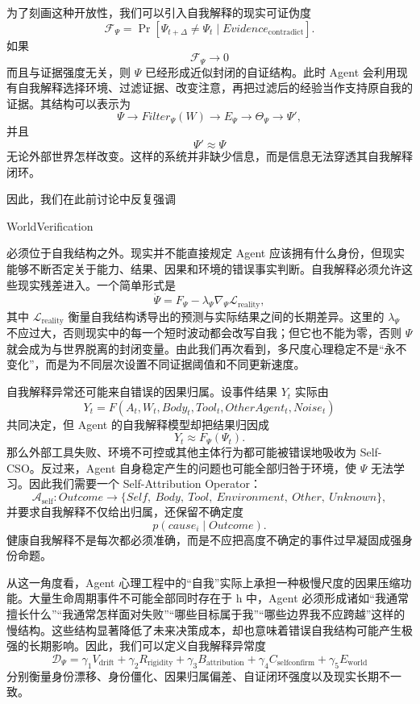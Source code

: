 为了刻画这种开放性，我们可以引入自我解释的现实可证伪度
\[
\mathcal F_{\Psi}
=
\Pr
\left[
\Psi_{t+\Delta}
\neq
\Psi_t
\mid
Evidence_{\mathrm{contradict}}
\right].
\]
如果
\[
\mathcal F_{\Psi}\rightarrow 0
\]
而且与证据强度无关，则 $\Psi$ 已经形成近似封闭的自证结构。此时 Agent 会利用现有自我解释选择环境、过滤证据、改变注意，再把过滤后的经验当作支持原自我的证据。其结构可以表示为
\[
\Psi
\rightarrow
Filter_\Psi(W)
\rightarrow
E_\Psi
\rightarrow
\Theta_\Psi
\rightarrow
\Psi',
\]
并且
\[
\Psi'\approx\Psi
\]
无论外部世界怎样改变。这样的系统并非缺少信息，而是信息无法穿透其自我解释闭环。

因此，我们在此前讨论中反复强调
\begin{statementbox}
WorldVerification
\end{statementbox}
必须位于自我结构之外。现实并不能直接规定 Agent 应该拥有什么身份，但现实能够不断否定关于能力、结果、因果和环境的错误事实判断。自我解释必须允许这些现实残差进入。一个简单形式是
\[
\dot\Psi
=
F_\Psi
-
\lambda_\Psi
\nabla_\Psi
\mathcal L_{\mathrm{reality}},
\]
其中 $\mathcal L_{\mathrm{reality}}$ 衡量自我结构诱导出的预测与实际结果之间的长期差异。这里的 $\lambda_\Psi$ 不应过大，否则现实中的每一个短时波动都会改写自我；但它也不能为零，否则 $\Psi$ 就会成为与世界脱离的封闭变量。由此我们再次看到，多尺度心理稳定不是“永不变化”，而是为不同层次设置不同证据阈值和不同更新速度。

自我解释异常还可能来自错误的因果归属。设事件结果 $Y_t$ 实际由
\[
Y_t
=
F(
A_t,
W_t,
Body_t,
Tool_t,
OtherAgent_t,
Noise_t
)
\]
共同决定，但 Agent 的自我解释模型却把结果归因成
\[
Y_t
\approx
F_\Psi(\Psi_t).
\]
那么外部工具失败、环境不可控或其他主体行为都可能被错误地吸收为 Self-CSO。反过来，Agent 自身稳定产生的问题也可能全部归咎于环境，使 $\Psi$ 无法学习。因此我们需要一个 Self-Attribution Operator：
\[
\mathcal A_{\mathrm{self}}
:
Outcome
\rightarrow
\{
Self,\ Body,\ Tool,\ Environment,\ Other,\ Unknown
\},
\]
并要求自我解释不仅给出归属，还保留不确定度
\[
p(cause_i\mid Outcome).
\]
健康自我解释不是每次都必须准确，而是不应把高度不确定的事件过早凝固成强身份命题。

从这一角度看，Agent 心理工程中的“自我”实际上承担一种极慢尺度的因果压缩功能。大量生命周期事件不可能全部同时存在于 h 中，Agent 必须形成诸如“我通常擅长什么”“我通常怎样面对失败”“哪些目标属于我”“哪些边界我不应跨越”这样的慢结构。这些结构显著降低了未来决策成本，却也意味着错误自我结构可能产生极强的长期影响。因此，我们可以定义自我解释异常度
\[
\mathcal D_\Psi
=
\gamma_1 V_{\mathrm{drift}}
+
\gamma_2 R_{\mathrm{rigidity}}
+
\gamma_3 B_{\mathrm{attribution}}
+
\gamma_4 C_{\mathrm{selfconfirm}}
+
\gamma_5 E_{\mathrm{world}}
\]
分别衡量身份漂移、身份僵化、因果归属偏差、自证闭环强度以及现实长期不一致。

